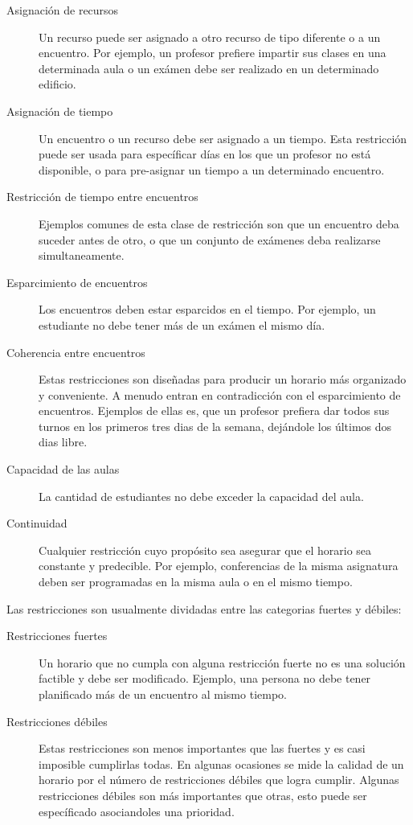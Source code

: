 \begin{description}
	\item[Asignación de recursos] Un recurso puede ser asignado a otro recurso de tipo diferente o a un encuentro.
		Por ejemplo, un profesor prefiere impartir sus clases en una determinada aula o un exámen debe ser realizado
		en un determinado edificio.
	\item[Asignación de tiempo] Un encuentro o un recurso debe ser asignado a un tiempo. Esta restricción puede
		ser usada para específicar días en los que un profesor no está disponible, o para pre-asignar un
		tiempo a un determinado encuentro.
	\item[Restricción de tiempo entre encuentros] Ejemplos comunes de esta clase de restricción son que un encuentro
		deba suceder antes de otro, o que un conjunto de exámenes deba realizarse simultaneamente.
	\item[Esparcimiento de encuentros] Los encuentros deben estar esparcidos en el tiempo. Por ejemplo, un
		estudiante no debe tener más de un exámen el mismo día.
	\item[Coherencia entre encuentros] Estas restricciones son diseñadas para producir un horario más organizado
		y conveniente. A menudo entran en contradicción con el esparcimiento de encuentros. Ejemplos de ellas es,
		que un profesor prefiera dar todos sus turnos en los primeros tres dias de la semana, dejándole los
		últimos dos dias libre.
	\item[Capacidad de las aulas] La cantidad de estudiantes no debe exceder la capacidad del aula.
	\item[Continuidad] Cualquier restricción cuyo propósito sea asegurar que el horario sea constante y predecible.
		Por ejemplo, conferencias de la misma asignatura deben ser programadas en la misma aula o en el mismo tiempo.
\end{description}

Las restricciones son usualmente dividadas entre las categorias fuertes y débiles:

\begin{description}
	\item[Restricciones fuertes] Un horario que no cumpla con alguna restricción fuerte no es una solución factible
		y debe ser modificado. Ejemplo, una persona no debe tener planificado más de un encuentro al mismo tiempo.
	\item[Restricciones débiles] Estas restricciones son menos importantes que las fuertes y es casi imposible
		cumplirlas todas. En algunas ocasiones se mide la calidad de un horario por el número de restricciones
		débiles que logra cumplir. Algunas restricciones débiles son más importantes que otras, esto puede ser
		específicado asociandoles una prioridad.
\end{description}

